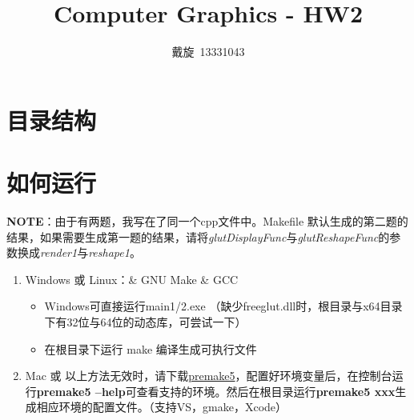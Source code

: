 \documentclass{article}
\title{Computer Graphics - HW2}
\author{戴旋\ 13331043}
\begin{document}
	\maketitle
	\tableofcontents

	\section{目录结构}


	\section{如何运行}
	\textbf{NOTE}：由于有两题，我写在了同一个cpp文件中。Makefile 默认生成的第二题的结果，如果需要生成第一题的结果，请将\textit{glutDisplayFunc}与\textit{glutReshapeFunc}的参数换成\textit{render1}与\textit{reshape1}。
	\begin{enumerate}
		\item Windows 或 Linux：\& GNU Make \& GCC
		\begin{itemize}
			\item Windows可直接运行main1/2.exe （缺少freeglut.dll时，根目录与x64目录下有32位与64位的动态库，可尝试一下）
			\item 在根目录下运行 make 编译生成可执行文件
		\end{itemize}
		\item Mac 或 以上方法无效时，请下载\href{http://premake.github.io/index.html}{premake5}，配置好环境变量后，在控制台运行\textbf{premake5 --help}可查看支持的环境。然后在根目录运行\textbf{premake5 xxx}生成相应环境的配置文件。（支持VS，gmake，Xcode）
	\end{enumerate}
	
\end{document}
